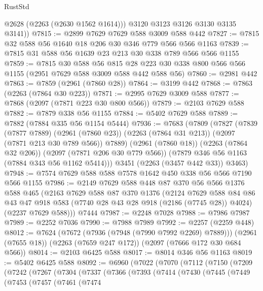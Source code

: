 \begin{lexlean}{RustStd}
\begin{coremodule}
          @2628
          (@2263 (@2630 @1562 @1614)))
        @3120
        @3123
        @3126
        @3130
        @3135
        @3141))
@7815 := @2899 @7629 @7629 @588 @3009 @588 @442
@7827 := @7815 @32 @588 @56 @1640 @18 @206 @30 @346 @779 @566 @566 @1163
@7839 := @7815 @31 @588 @56 @1639 @23 @213 @30 @338 @789 @566 @566 @1155
@7859 := @7815
    @30
    @588
    @56
    @815
    @28
    @223
    @30
    @338
    @800
    @566
    @566
    @1155
    (@2951 @7629 @588 @3009 @588 @442 @588 @56)
@7860 := @2981 @442
@7863 := @7859 (@2961 (@7860 @28))
@7864 := @3199 @442
@7868 := @7863 (@2263 (@7864 @30 @223))
@7871 := @2995 @7629 @3009 @588
@7877 := @7868 (@2097 (@7871 @223 @30 @800 @566))
@7879 := @2103 @7629 @588
@7882 := @7879 @338 @56 @1155
@7884 := @5402 @7629 @588
@7889 := @7882 (@7884 @335 @56 @1154 @5444)
@7936 := @7683
    (@7809
      (@7827
        (@7839
          (@7877 @7889)
          (@2961 (@7860 @23))
          (@2263 (@7864 @31 @213))
          (@2097 (@7871 @213 @30 @789 @566))
          @7889)
        (@2961 (@7860 @18))
        (@2263 (@7864 @32 @206))
        (@2097 (@7871 @206 @30 @779 @566))
        (@7879 @346 @56 @1163 (@7884 @343 @56 @1162 @5414)))
      @3451
      (@2263 (@3457 @442 @33))
      @3463)
@7948 := @7574 @7629 @588 @588 @7578 @1642 @450 @338 @56 @566 @7190 @566 @1155
@7986 := @2149
    @7629
    @588
    @448
    @87
    @370
    @56
    @566
    @1376
    @588
    @465
    (@2163
      @7629
      @588
      @87
      @370
      @1376
      (@2124
        @7629
        @588
        @84
        @86
        @43
        @47
        @918
        @583
        (@7740 @28 @43 @28 @918 (@2186 (@7745 @28)) @4024)
        (@2237 @7629 @588)))
    @7444
@7987 := @2248 @7028
@7988 := @7986 @7987
@7989 := @2252 @7036
@7990 := @7988 @7989
@7992 := @2257 (@2259 @448)
@8012 := @7624
    (@7672 (@7936 (@7948 (@7990 @7992 @2269) @7889)))
    (@2961 (@7655 @18))
    (@2263 (@7659 @247 @172))
    (@2097 (@7666 @172 @30 @684 @566))
@8014 := @2103 @6425 @588
@8017 := @8014 @346 @56 @1163
@8019 := @5402 @6425 @588
@8092 := @6960
    (@7022
      (@7070
        (@7112
          (@7150
            (@7209
              (@7242
                (@7267
                  (@7304
                    (@7337
                      (@7366
                        (@7393
                          (@7414
                            (@7430
                              (@7445
                                (@7449
                                  (@7453
                                    (@7457
                                      (@7461
                                        (@7474

\end{coremodule}
\end{lexlean}
